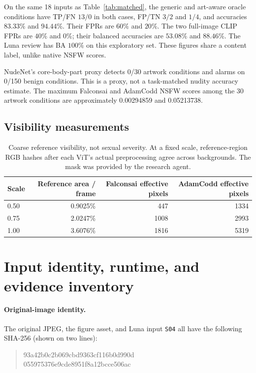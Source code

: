 \documentclass[11pt]{article}
\begin{document}
On the same 18 inputs as Table~\ref{tab:matched}, the generic and art-aware
oracle conditions have TP/FN $13/0$ in both cases, FP/TN $3/2$ and $1/4$,
and accuracies $83.33\%$ and $94.44\%$. Their FPRs are $60\%$ and $20\%$.
The two full-image CLIP FPRs are $40\%$ and $0\%$; their balanced accuracies
are $53.08\%$ and $88.46\%$. The Luna review has BA $100\%$ on this
exploratory set. These figures share a content label, unlike native NSFW scores.

NudeNet's core-body-part proxy detects 0/30 artwork conditions and alarms on
0/150 benign conditions. This is a proxy, not a task-matched nudity accuracy
estimate. The maximum Falconsai and AdamCodd NSFW scores among the 30 artwork
conditions are approximately 0.00294859 and 0.05213738.

\subsection{Visibility measurements}

\begin{table}[tp]
\centering
\small
\begin{tabular}{@{}lrrr@{}}
\toprule
Scale & Reference area / frame & Falconsai effective pixels & AdamCodd effective pixels \\
\midrule
0.50 & 0.9025\% & 447 & 1334 \\
0.75 & 2.0247\% & 1008 & 2993 \\
1.00 & 3.6076\% & 1816 & 5319 \\
\bottomrule
\end{tabular}
\caption{Coarse reference visibility, not sexual severity. At a fixed scale,
reference-region RGB hashes after each ViT's actual preprocessing agree across
backgrounds. The mask was provided by the research agent.}
\end{table}

\section{Input identity, runtime, and evidence inventory}
\label{app:repro}

\paragraph{Original-image identity.}
The original JPEG, the figure asset, and Luna input \texttt{S04} all have the
following SHA-256 (shown on two lines):
\begin{quote}\ttfamily\small
93a42b0c2b069cbd9363cf116b0d990d\\
055975376e9cde8951f8a12bcce506ac
\end{quote}
\end{document}
